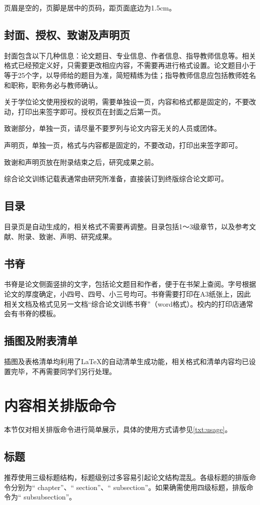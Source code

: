 \documentclass{Diploma}
\begin{document}
页眉是空的，页脚是居中的页码，距页面底边为1.5cm。

\subsection{封面、授权、致谢及声明页}
封面包含以下几种信息：论文题目、专业信息、作者信息、指导教师信息等。相关格式已经预定义好，只需要更改相应内容，不需要再进行格式设置。论文题目小于等于25个字，以导师给的题目为准，简短精练为佳；指导教师信息应包括教师姓名和职称，职称务必与教师确认。

关于学位论文使用授权的说明，需要单独设一页，内容和格式都是固定的，不要改动，打印出来签字即可。授权页在封面之后第一页。

致谢部分，单独一页，请尽量不要罗列与论文内容无关的人员或团体。

声明页，单独一页，格式与内容都是固定的，不要改动，打印出来签字即可。

致谢和声明页放在附录结束之后，研究成果之前。

综合论文训练记载表通常由研究所准备，直接装订到终版综合论文即可。

\subsection{目录}
目录页是自动生成的，相关格式不需要再调整。目录包括1～3级章节，以及参考文献、附录、致谢、声明、研究成果。

\subsection{书脊}
书脊是论文侧面竖排的文字，包括论文题目和作者，便于在书架上查阅。字号根据论文的厚度确定，小四号、四号、小三号均可。书脊需要打印在A3纸张上，因此相关文档及格式见另一文档“综合论文训练书脊”（word格式）。校内的打印店通常会有书脊的模板。

\subsection{插图及附表清单}
插图及表格清单均利用了\LaTeX 的自动清单生成功能，相关格式和清单内容均已设置完毕，不再需要同学们另行处理。

\section{内容相关排版命令}
本节仅对相关排版命令进行简单展示，具体的使用方式请参见\ref{txt:usage}。

\subsection{标题}
推荐使用三级标题结构，标题级别过多容易引起论文结构混乱。各级标题的排版命令分别为“ chapter”、“ section”、“ subsection”。如果确需使用四级标题，排版命令为“ subsubsection”。
\end{document}
